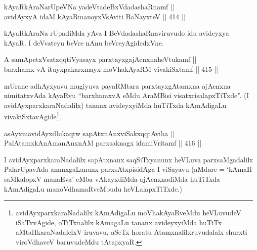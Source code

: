 
\begin{shl}
kAyaRkAraNarUpeVNa yadeVtadeBxVdadashaRnamf || \\
avidAyxyA idaM kAyaRmanoyxV\s sAviti BaNayxteV \hfill || 414 ||  
\end{shl}

\begin{artha}
kAyaRkAraNa rUpadiMda yAva I BeVdadashaRnaviruvudo idu avideyxya kAyaR.
I deVvateyu beVre nAnu beVreyAgidedxVne.
\end{artha}


\begin{shl}
A samApetxVsatxqqtiVyasayx parxtayxgajAcnxnaheVtukamf || \\
barxhamx vA ituyxpakarxmayx moVhakAyaRM vivakiSxtamf \hfill || 415 ||  
\end{shl}

\begin{artha}
mUrane adhAyxyavu mugiyuva payaRMtara parxtayxgAtamxna ajAcnxna
nimitatxvAda kAyaRvu ``barxhamxvA eMdu AraMBisi\break
visatxrisalapxTiTxde''. (I avidAyxparxkaraNadalilx) tananx
avideyxyiMda huTiTxda kAmAdigaLu
vivakiSxtavAgide\footnote{avidAyxparxkaraNadalilx kAmAdigaLu
moVhakAyaRveMdu heVLuvudeV iSaTxvAgide, oTiTxnalilx kAmagaLu tananx
avideyxyiMda huTiTx aMtaHkaraNadalelxV iruvavu, aSeTx horatu
Atamxnalilxruvudalalx shurxti viroVdhaveV baruvudeMdu tAtapxyaR.}. 
\end{artha}

\begin{shl}
asAyxmavidAyxdhikaqtw sapAtxnAnxviSakxqqtAviha || \\
PalAtamxkAnAmanAnxnAM parxsaknagx idamiVritamf \hfill || 416 ||  
\end{shl}

\begin{artha}
I avidAyxparxkaraNadalilx sapAtxnanx saqSiTxyanunx heVLuva
parxsaMgadalilx PalarUpavAda ananxgaLanunx parxsAtxpisidAga I viSayavu
(aMdare = `kAmaH saMkalopxV \mdash   manaEva' eMba vAkayxdiMda
ajAcnxnadiMda huTiTxda kAmAdigaLu manoVdhamaRveMbudu heVLalapxTiTxde.)
\end{artha}


